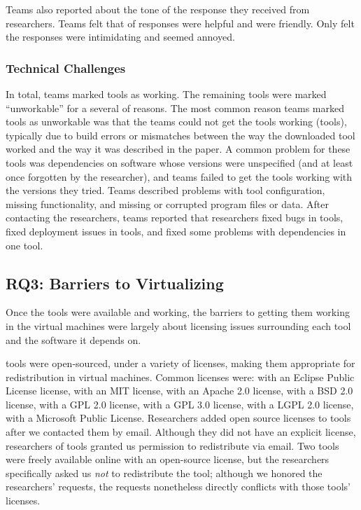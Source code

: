 \documentclass[10pt,conference]{IEEEtran}
\begin{document}

Teams also reported about the tone of the response they received from 
researchers.
Teams felt that \emailsHelpful of responses were helpful and
\emailsFriendly were friendly.
Only \emailsIntimidating felt the responses were intimidating
and \emailsAnnoyed seemed annoyed.                                                                                                              


\subsubsection{Technical Challenges}

In total, teams marked \working tools as working.
The remaining tools were marked ``unworkable'' for a 
several of reasons.
The most common reason teams marked tools as unworkable
was that the teams could not get the tools 
working (\unworkCouldntWorkIt tools),
typically due to build errors or mismatches between
the way the downloaded tool worked and the way 
it was described in the paper.
A common problem for these tools was dependencies on
software whose versions were unspecified 
(and at least once forgotten by the researcher), and teams
failed to get the tools working with the versions they
tried.
Teams described problems with 
tool configuration,
missing functionality, and
missing or corrupted program files or data.
After contacting the researchers, teams reported that researchers 
fixed bugs in \contactFixBug tools,
fixed deployment issues in \contactFixDepl tools,
and fixed some problems with dependencies in one tool.

\subsection{RQ3: Barriers to Virtualizing}

Once the tools were available and working, 
the barriers to getting them working in the
virtual machines were largely about licensing issues
surrounding each tool and the software it depends on.

\redistPermissionArtifact tools were open-sourced, 
under a variety of licenses, making them appropriate
for redistribution in virtual machines.
Common licenses were:
\licenseEPL with an Eclipse Public License license,
\licenseMIT with an MIT license,
\licenseApache with an Apache 2.0 license,
\licenseBSD with a BSD 2.0 license,
\licenseGPL with a GPL 2.0 license,
\licenseGPLThree with a GPL 3.0 license,
\licenseLGPL with a LGPL 2.0 license,
\licenseMPL with a Microsoft Public License.
Researchers added open source licenses to \contactOSSed tools
after we contacted them by email.	
Although they did not have an explicit license,
researchers of \redistPermissionEmail tools granted us
permission to redistribute via email.
Two tools were freely available online
with an open-source license, but the researchers
specifically asked us \emph{not} to redistribute the
tool; although we honored the researchers' requests,
the requests nonetheless directly conflicts
with those tools' licenses.  
\end{document}
